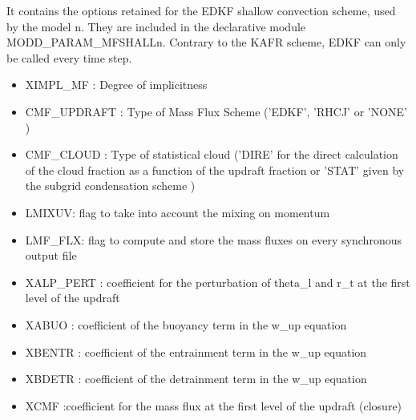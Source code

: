 It contains the options retained for the EDKF shallow convection scheme, used
by the  model n. They are included in the declarative module
MODD\_PARAM\_MFSHALLn. Contrary to the KAFR scheme,
EDKF can only be called  every time step. 

\begin{itemize}
\item
{}
XIMPL\_MF : Degree of implicitness                                                        
\item
{}
CMF\_UPDRAFT : Type of Mass Flux Scheme                              
('EDKF', 'RHCJ' or 'NONE' )
\item
{}
CMF\_CLOUD : Type of statistical cloud                                 
('DIRE' for the direct calculation of the cloud fraction as a function of the updraft fraction 
or 'STAT' given by the subgrid condensation scheme )
\item
{}
LMIXUV: flag to take into account the mixing on momentum      
\item
{}
LMF\_FLX: flag to compute and store the mass fluxes on every synchronous output  file
\item
{}
XALP\_PERT : coefficient for the perturbation of theta\_l and r\_t at the first level of the updraft
\item
{}
XABUO : coefficient of the buoyancy term in the w\_up equation
\item
{}
XBENTR : coefficient of the entrainment term in the w\_up equation
\item
{}
XBDETR : coefficient of the detrainment term in the w\_up equation
\item
{}
XCMF :coefficient for the mass flux at the first level of the updraft (closure)


\end{itemize}
